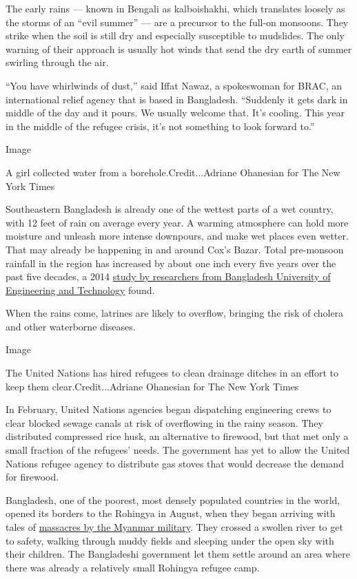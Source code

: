 The early rains --- known in Bengali as kalboishakhi, which translates
loosely as the storms of an ``evil summer'' --- are a precursor to the
full-on monsoons. They strike when the soil is still dry and especially
susceptible to mudslides. The only warning of their approach is usually
hot winds that send the dry earth of summer swirling through the air.

``You have whirlwinds of dust,'' said Iffat Nawaz, a spokeswoman for
BRAC, an international relief agency that is based in Bangladesh.
``Suddenly it gets dark in middle of the day and it pours. We usually
welcome that. It's cooling. This year in the middle of the refugee
crisis, it's not something to look forward to.''

Image

A girl collected water from a borehole.Credit...Adriane Ohanesian for
The New York Times

Southeastern Bangladesh is already one of the wettest parts of a wet
country, with 12 feet of rain on average every year. A warming
atmosphere can hold more moisture and unleash more intense downpours,
and make wet places even wetter. That may already be happening in and
around Cox's Bazar. Total pre-monsoon rainfall in the region has
increased by about one inch every five years over the past five decades,
a 2014
\href{http://teacher.buet.ac.bd/akmsaifulislam/reports/Heavy_Rainfall_report.pdf}{study
by researchers from Bangladesh University of Engineering and Technology}
found.

When the rains come, latrines are likely to overflow, bringing the risk
of cholera and other waterborne diseases.

Image

The United Nations has hired refugees to clean drainage ditches in an
effort to keep them clear.Credit...Adriane Ohanesian for The New York
Times

In February, United Nations agencies began dispatching engineering crews
to clear blocked sewage canals at risk of overflowing in the rainy
season. They distributed compressed rice husk, an alternative to
firewood, but that met only a small fraction of the refugees' needs. The
government has yet to allow the United Nations refugee agency to
distribute gas stoves that would decrease the demand for firewood.

Bangladesh, one of the poorest, most densely populated countries in the
world, opened its borders to the Rohingya in August, when they began
arriving with tales of
\href{https://www.nytimes3xbfgragh.onion/2017/09/02/world/asia/rohingya-myanmar-bangladesh-refugees-massacre.html}{massacres
by the Myanmar military}. They crossed a swollen river to get to safety,
walking through muddy fields and sleeping under the open sky with their
children. The Bangladeshi government let them settle around an area
where there was already a relatively small Rohingya refugee camp.

